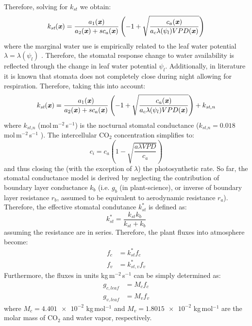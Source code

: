Therefore, solving for $k_{\textit{st}}$ we obtain:
\begin{equation}
k_{\textit{st}}(\textbf{\textit{x}}) = \frac{a_1(\textbf{\textit{x}}) }{a_2(\textbf{\textit{x}})  + s c_a(\textbf{\textit{x}}) } \left( -1 + \sqrt{\frac{c_a(\textbf{\textit{x}}) }{a_c \lambda(\psi_l)  VPD(\textbf{\textit{x}}) }} \right)
\end{equation}
where the marginal water use is empirically related to the leaf water potential $\lambda = \lambda(\psi_l)$ \citep{Manoli2014,Katul2010}. Therefore, the stomatal response change to water availability is reflected through the change in leaf water potential $\psi_l$.  Additionally, in literature it is known that stomata does not completely close during night allowing for respiration. Therefore, taking this into account:
\begin{equation}
k_{\textit{st}}(\textbf{\textit{x}}) = \frac{a_1(\textbf{\textit{x}}) }{a_2(\textbf{\textit{x}})  + s c_a(\textbf{\textit{x}}) } \left( -1 + \sqrt{\frac{c_a(\textbf{\textit{x}}) }{a_c \lambda(\psi_l)  VPD(\textbf{\textit{x}}) }} \right) + k_{\textit{st,n}}
\end{equation}
where $k_{\textit{st,n}}$ (mol\,m$^{-2}$\,s$^{-1}$) is the nocturnal stomatal conductance ($k_{\textit{st,n}} = 0.018$ mol\,m$^{-2}$\,s$^{-1}$ \citep{Manoli2014}). The intercellular CO$_2$ concentration simplifies to:
\begin{equation}
c_i = c_a \left(1 - \sqrt{\frac{a \lambda \textit{VPD} }{c_a}} \right)
\end{equation}
and thus closing the (with the exception of $\lambda$) the photosynthetic rate. So far, the stomatal conductance model is derived by neglecting the contribution of boundary layer conductance $k_{b}$ (i.e. $g_b$ (in plant-science), or inverse of boundary layer resistance $r_b$, assumed to be equivalent to aerodynamic resistance $r_a$). Therefore, the effective stomatal condutance $k_{st}^*$ is defined as:
\begin{equation}
k_{st}^* = \frac{k_{st} k_b}{k_{st} + k_b}
\end{equation}
assuming the resistance are in series. Therefore, the plant fluxes into atmosphere become:
\begin{align}
	f_{c} &= k_{st}^* f_c \\
	f_{v} &= k_{st,v}^*  f_v
\end{align}
Furthermore, the fluxes in units kg\,m$^{-2}$\,s$^{-1}$ can be simply determined as:
\begin{align}
g_{c,leaf} &= M_c f_c \\
g_{v,leaf} &= M_v f_v
\end{align}
where $M_c = \num{4.401e-2}$ kg\,mol$^{-1}$ and $M_v = \num{1.8015e-2}$ kg\,mol$^{-1}$ are the molar mass of CO$_2$ and water vapor, respectively. 

